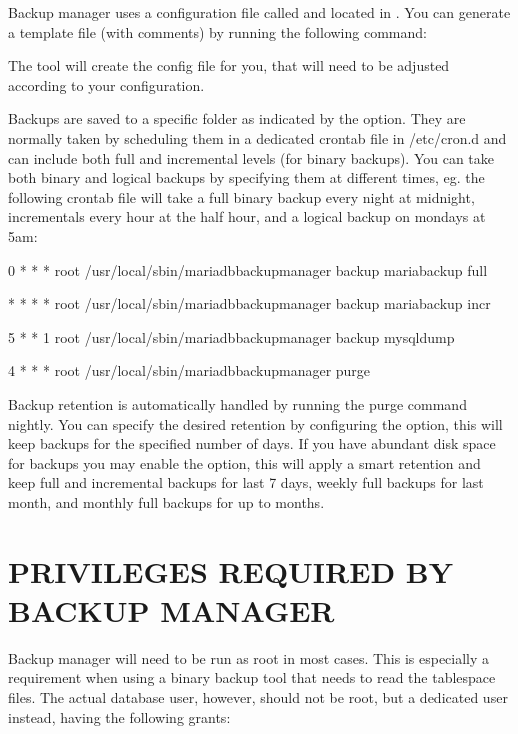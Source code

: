 \documentclass[letterpaper,10pt,english]{sphinxmanual}
\begin{document}
\sphinxAtStartPar
Backup manager uses a configuration file called  and located
in . You can generate a template file (with comments) by running
the following command:

\sphinxAtStartPar
{}

\sphinxAtStartPar
The tool will create the config file for you, that will need to be adjusted
according to your configuration.

\sphinxAtStartPar
Backups are saved to a specific folder as indicated by the  option.
They are normally taken by scheduling them in a dedicated crontab file in /etc/cron.d
and can include both full and incremental levels (for binary backups). You can take
both binary and logical backups by specifying them at different times, eg. the
following crontab file will take a full binary backup every night at midnight,
incrementals every hour at the half hour, and a logical backup on mondays at 5am:

 0 * * * root /usr/local/sbin/mariadb\sphinxhyphen{}backup\sphinxhyphen{}manager backup mariabackup full

 * * * * root /usr/local/sbin/mariadb\sphinxhyphen{}backup\sphinxhyphen{}manager backup mariabackup incr

 5 * * 1 root /usr/local/sbin/mariadb\sphinxhyphen{}backup\sphinxhyphen{}manager backup mysqldump

 4 * * * root /usr/local/sbin/mariadb\sphinxhyphen{}backup\sphinxhyphen{}manager purge

\sphinxAtStartPar
Backup retention is automatically handled by running the purge command nightly.
You can specify the desired retention by configuring the  option, this will
keep backups for the specified number of days. If you have abundant disk space for
backups you may enable the  option, this will apply a smart retention
and keep full and incremental backups for last 7 days, weekly full backups for
last month, and monthly full backups for up to  months.


\section{PRIVILEGES REQUIRED BY BACKUP MANAGER}
\label{\detokenize{mariadb-backup-manager:privileges-required-by-backup-manager}}
\sphinxAtStartPar
Backup manager will need to be run as root in most cases. This is especially a
requirement when using a binary backup tool that needs to read the tablespace files.
The actual database user, however, should not be root, but a dedicated user instead,
having the following grants:
\end{document}
